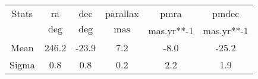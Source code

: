 \begin{table}
\begin{tabular}{cccccc}
Stats & ra & dec & parallax & pmra & pmdec \\
 & $\mathrm{deg}$ & $\mathrm{deg}$ & $\mathrm{mas}$ & mas.yr**-1 & mas.yr**-1 \\
Mean & 246.2 & -23.9 & 7.2 & -8.0 & -25.2 \\
Sigma & 0.8 & 0.8 & 0.2 & 2.2 & 1.9 \\
\end{tabular}
\end{table}
